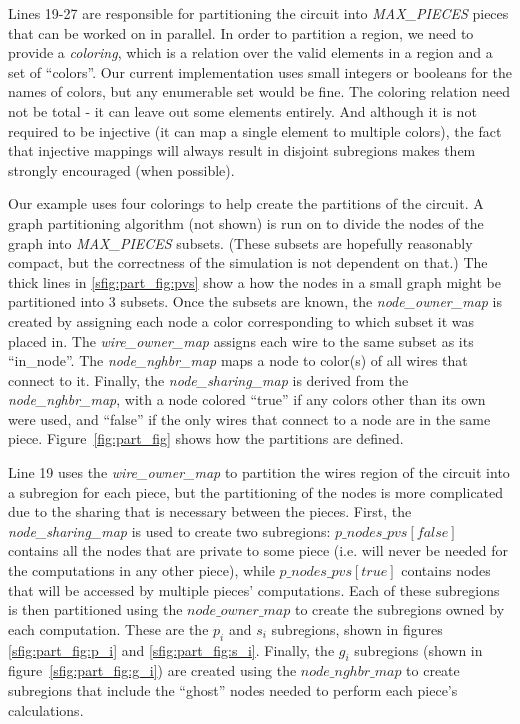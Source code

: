 %

Lines 19-27 are responsible for partitioning the circuit into \emph{MAX\_PIECES}
pieces that can be worked on in parallel.  In order to partition a region, we
need to provide a \emph{coloring}, which is a relation over the valid elements
in a region and a set of ``colors''.  Our current implementation uses small
integers or booleans for the names of colors, but any enumerable set would be
fine.  The coloring relation need not be total - it can leave out some elements entirely.  And although it is not required to be injective (it can map a single
element to multiple colors), the fact that injective mappings will always
result in disjoint subregions makes them strongly encouraged (when possible).

Our example uses four colorings to help create the partitions of the circuit.
A graph partitioning algorithm
(not shown) is run on to divide the nodes of the graph into \emph{MAX\_PIECES}
subsets.  (These subsets are hopefully reasonably compact, but the correctness
of the simulation is not dependent on that.)  The thick lines in \ref{sfig:part_fig:pvs}
show a how the nodes in a small graph might be partitioned into 3 subsets.
Once the subsets are known, the \emph{node\_owner\_map} is created by assigning
each node a color corresponding to which subset it was placed in.  The 
\emph{wire\_owner\_map} assigns each wire to the same subset as its ``in\_node''.
The \emph{node\_nghbr\_map} maps a node to color(s) of all wires that 
connect to it.  Finally, the \emph{node\_sharing\_map} is derived from the
\emph{node\_nghbr\_map}, with a node colored ``true'' if any colors other than 
its own were used, and ``false'' if the only wires that connect to a node are
in the same piece.
Figure~\ref{fig:part_fig} shows how the partitions are defined.

Line 19 uses the \emph{wire\_owner\_map} to partition the wires region of the
circuit into a subregion for each piece, but the partitioning of the nodes is
more complicated due to the sharing that is necessary between the pieces.
First, the \emph{node\_sharing\_map} is used to create two subregions: $p\_nodes\_pvs[false]$ contains all the nodes that are private to some piece (i.e. will
never be needed for the computations in any other piece), while $p\_nodes\_pvs[true]$ contains nodes that will be accessed by multiple pieces' computations.
Each of these subregions is then partitioned using the $node\_owner\_map$ to
create the subregions owned by each computation.  These are the $p_i$ and $s_i$
subregions, shown in figures \ref{sfig:part_fig:p_i} and \ref{sfig:part_fig:s_i}.  Finally, the $g_i$ subregions (shown in figure~\ref{sfig:part_fig:g_i}) are
created using the $node\_nghbr\_map$ to 
create subregions that include the ``ghost'' nodes needed to perform each
piece's calculations.

